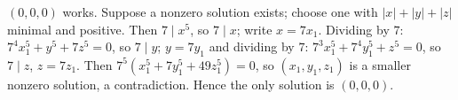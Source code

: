 $(0,0,0)$ works. Suppose a nonzero solution exists; choose one with $|x|+|y|+|z|$ minimal and positive. Then $7\mid x^5$, so $7\mid x$; write $x=7x_1$. Dividing by $7$: $7^4x_1^5+y^5+7z^5=0$, so $7\mid y$; $y=7y_1$ and dividing by $7$: $7^3x_1^5+7^4y_1^5+z^5=0$, so $7\mid z$, $z=7z_1$. Then $7^5(x_1^5+7y_1^5+49z_1^5)=0$, so $(x_1,y_1,z_1)$ is a smaller nonzero solution, a contradiction. Hence the only solution is $\boxed{(0,0,0)}$.
